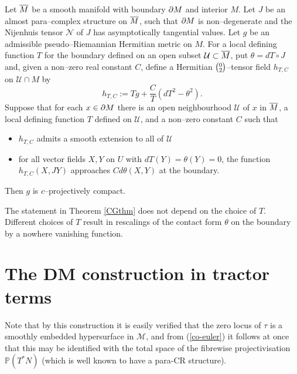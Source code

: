 \begin{theo}[\cite{CG}] \label{CGthm}
Let $\overline{M}$ be a smooth manifold with boundary $\partial M$ and interior $M$. Let $J$ be an almost para--complex structure on $\overline{M}$, such that $\partial M$ is non--degenerate and the Nijenhuis tensor $\mathcal{N}$ of $J$ has asymptotically tangential values. Let $g$ be an admissible pseudo--Riemannian Hermitian metric on $M$. For a local defining function $T$ for the boundary defined on an open 
subset ${\mathcal U}\subset \overline{M}$, put $\theta=dT\circ J$ and, given a non--zero real 
constant $C$, define a Hermitian $\big(\negthinspace\begin{smallmatrix}
0 \\ 2
\end{smallmatrix}\negthinspace\big)$--tensor field $h_{T,C}$ on 
${\mathcal U}\cap M$ by
\[
h_{T,C}:=Tg+\frac{C}{T}(dT^2-\theta^2).
\]
Suppose that for each $x\in\partial M$ there is an open neighbourhood 
${\mathcal{U}}$ of $x$ in $\overline{M}$, a local defining function $T$ defined on 
${\mathcal{U}}$, and a non--zero constant $C$ such that
\begin{itemize}
\item $h_{T,C}$ admits a smooth extension to all of $\mathcal{U}$
\item for all vector fields $X,Y$ on $U$ with $dT(Y)=\theta(Y)=0$, the function $h_{T,C}(X,JY)$ approaches $Cd\theta(X,Y)$ at the boundary.
\end{itemize}
Then $g$ is $c$--projectively compact.
\end{theo}
The statement in  Theorem \ref{CGthm} does not depend on the choice of $T$. Different choices of $T$ result in rescalings of the contact form $\theta$ on the boundary by a nowhere vanishing function.

\section{The DM construction in tractor terms}

\begin{rmk}
Note that by this construction it is easily verified that the zero
locus of $\tau$ is a smoothly
embedded hypersurface in $\mathcal{M}$,  and from (\ref{co-euler}) it follows
at once that this may be identified with the total space of the
fibrewise projectivisation $\mathbb{P}(T^*N)$ (which is well known to
have a para-CR structure). 
\end{rmk}

